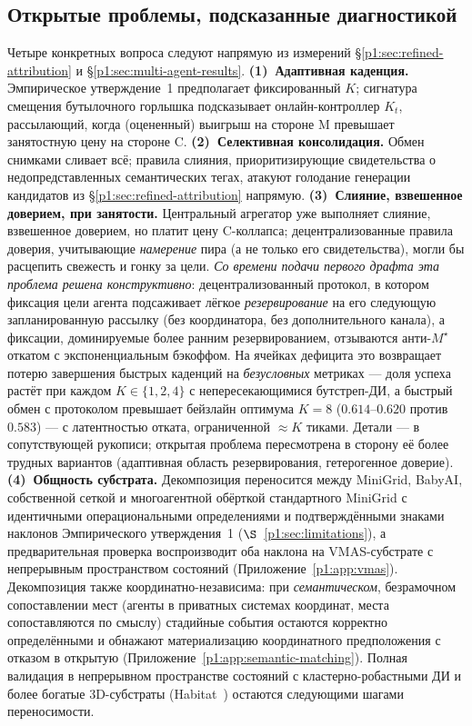 \documentclass{article}
\begin{document}
\subsection{Открытые проблемы, подсказанные диагностикой}
\label{p1:app:open-problems}

Четыре конкретных вопроса следуют напрямую из измерений \S\ref{p1:sec:refined-attribution} и \S\ref{p1:sec:multi-agent-results}.
\textbf{(1)~Адаптивная каденция.} Эмпирическое утверждение~1 предполагает фиксированный $K$; сигнатура смещения бутылочного горлышка подсказывает онлайн-контроллер $K_t$, рассылающий, когда (оцененный) выигрыш на стороне M превышает занятостную цену на стороне C.
\textbf{(2)~Селективная консолидация.} Обмен снимками сливает всё; правила слияния, приоритизирующие свидетельства о недопредставленных семантических тегах, атакуют голодание генерации кандидатов из \S\ref{p1:sec:refined-attribution} напрямую.
\textbf{(3)~Слияние, взвешенное доверием, при занятости.} Центральный агрегатор уже выполняет слияние, взвешенное доверием, но платит цену C-коллапса; децентрализованные правила доверия, учитывающие \emph{намерение} пира (а не только его свидетельства), могли бы расцепить свежесть и гонку за цели. \emph{Со времени подачи первого драфта эта проблема решена конструктивно}: децентрализованный протокол, в котором фиксация цели агента подсаживает лёгкое \emph{резервирование} на его следующую запланированную рассылку (без координатора, без дополнительного канала), а фиксации, доминируемые более ранним резервированием, отзываются анти-$M^\star$ откатом с экспоненциальным бэкоффом. На ячейках дефицита это возвращает потерю завершения быстрых каденций на \emph{безусловных} метриках --- доля успеха растёт при каждом $K\in\{1,2,4\}$ с непересекающимися бутстреп-ДИ, а быстрый обмен с протоколом превышает бейзлайн оптимума $K{=}8$ ($0.614$--$0.620$ против $0.583$) --- с латентностью отката, ограниченной ${\approx}K$ тиками. Детали --- в сопутствующей рукописи; открытая проблема пересмотрена в сторону её более трудных вариантов (адаптивная область резервирования, гетерогенное доверие).
\textbf{(4)~Общность субстрата.} Декомпозиция переносится между MiniGrid, BabyAI, собственной сеткой и многоагентной обёрткой стандартного MiniGrid с идентичными операциональными определениями и подтверждёнными знаками наклонов Эмпирического утверждения~1 ($\S$~\ref{p1:sec:limitations}), а предварительная проверка воспроизводит оба наклона на VMAS-субстрате с непрерывным пространством состояний (Приложение~\ref{p1:app:vmas}). Декомпозиция также координатно-независима: при \emph{семантическом}, безрамочном сопоставлении мест (агенты в приватных системах координат, места сопоставляются по смыслу) стадийные события остаются корректно определёнными и обнажают материализацию координатного предположения с отказом в открытую (Приложение~\ref{p1:app:semantic-matching}). Полная валидация в непрерывном пространстве состояний с кластерно-робастными ДИ и более богатые 3D-субстраты (Habitat~\citep{savva2019habitat}) остаются следующими шагами переносимости.
\end{document}
